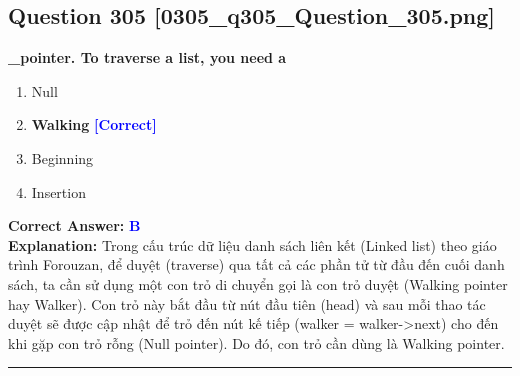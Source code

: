 \documentclass[11pt,a4paper]{article}
\begin{document}
\begin{minipage}{\textwidth}
\subsection*{Question 305 \quad \footnotesize{[0305\_q305\_Question\_305.png]}}
\noindent \textbf{\_pointer. To traverse a list, you need a}

\begin{enumerate}[label=\Alph*.]
    \item Null
    \item \textbf{Walking} \hfill \textcolor{blue}{\textbf{[Correct]}}
    \item Beginning
    \item Insertion
\end{enumerate}

\noindent \textbf{Correct Answer:} \textcolor{blue}{\textbf{B}} \\[2pt]
\noindent \textbf{Explanation:} Trong cấu trúc dữ liệu danh sách liên kết (Linked list) theo giáo trình Forouzan, để duyệt (traverse) qua tất cả các phần tử từ đầu đến cuối danh sách, ta cần sử dụng một con trỏ di chuyển gọi là con trỏ duyệt (Walking pointer hay Walker). Con trỏ này bắt đầu từ nút đầu tiên (head) và sau mỗi thao tác duyệt sẽ được cập nhật để trỏ đến nút kế tiếp (walker = walker->next) cho đến khi gặp con trỏ rỗng (Null pointer). Do đó, con trỏ cần dùng là Walking pointer.

\par\vspace{0.3cm}
\hrule
\vspace{0.3cm}
\end{minipage}
\end{document}
